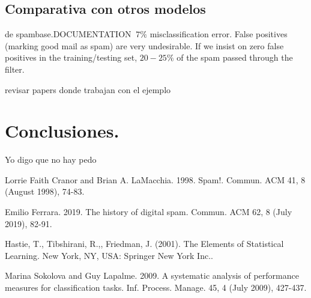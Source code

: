 \documentclass[12pt, letterpaper]{article}
\begin{document}
\subsection{Comparativa con otros modelos}

de spambase.DOCUMENTATION
$~7\%$ misclassification error.
False positives (marking good mail as spam) are very undesirable.
If we insist on zero false positives in the training/testing set,
$20-25\%$ of the spam passed through the filter.

revisar papers donde trabajan con el ejemplo

\section{Conclusiones.}
Yo digo que no hay pedo

\begin{thebibliography}{1}

Lorrie Faith Cranor and Brian A. LaMacchia. 1998. Spam!. Commun. ACM 41, 8 (August 1998), 74-83. 

Emilio Ferrara. 2019. The history of digital spam. Commun. ACM 62, 8 (July 2019), 82-91. 

Hastie, T., Tibshirani, R.,, Friedman, J. (2001). The Elements of Statistical Learning. New York, NY, USA: Springer New York Inc.. 

Marina Sokolova and Guy Lapalme. 2009. A systematic analysis of performance measures for classification tasks. Inf. Process. Manage. 45, 4 (July 2009), 427-437. 

\end{thebibliography}
\end{document}

